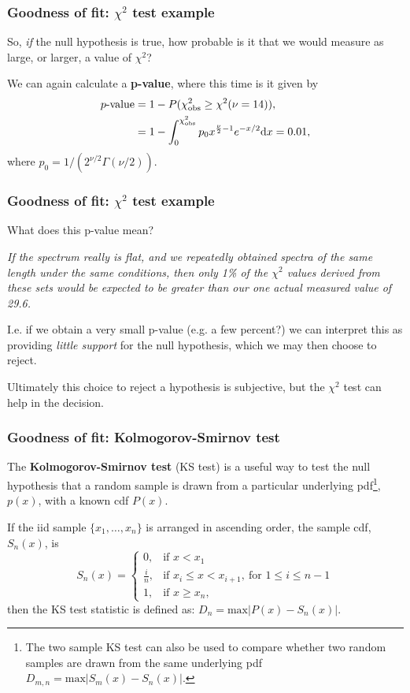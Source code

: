 \begin{frame}

\frametitle{Goodness of fit: $\chi^2$ test example}
\label{goodnessoffit:chi2testexample}

So, \emph{if} the null hypothesis is true, how probable is it that we would measure as large, or larger, a
value of $\chi^2$?

We can again calculate a \textbf{p-value}, where this time is it given by
\begin{align*}
p\text{-value} &= 1 - P(\chi^2_{\rm obs} \ge \chi^2(\nu=14)), \\
&= 1-\int_0^{\chi^2_{\rm obs}} p_0 x^{\frac{\nu}{2}-1}e^{-x/2} {\rm d}x = 0.01,
\end{align*}
where $p_0 = 1/(2^{\nu/2}\Gamma(\nu/2))$.

\end{frame}

\begin{frame}

\frametitle{Goodness of fit: $\chi^2$ test example}
\label{goodnessoffit:chi2testexample}

What does this p-value mean?

\emph{If the spectrum really is flat, and we repeatedly obtained spectra of the same length under the same
conditions, then only 1\% of the $\chi^2$ values derived from these sets would be expected to be greater
than our one actual measured value of 29.6.}

I.e. if we obtain a very small p-value (e.g. a few percent?) we can interpret this as providing \emph{little support}
for the null hypothesis, which we may then choose to reject.

Ultimately this choice to reject a hypothesis is subjective, but the $\chi^2$ test can help in the decision.

\end{frame}

\begin{frame}

\frametitle{Goodness of fit: Kolmogorov-Smirnov test}
\label{goodnessoffit:kolmogorov-smirnovtest}

The \textbf{Kolmogorov-Smirnov test} (KS test) is a useful way to test the null hypothesis that a random sample
is drawn from a particular underlying pdf\footnote{The two sample KS test can also be used to compare whether two random samples are drawn
from the same underlying pdf $D_{m,n} = \text{max}\left|S_m(x) - S_n(x)\right|$.}, $p(x)$, with a known cdf $P(x)$.

If the iid sample $\{x_1,\ldots,x_n\}$ is arranged in ascending order, the sample cdf, $S_n(x)$, is
\[
S_n(x) = 
\begin{cases}
0, & \text{if } x < x_1 \\
\frac{i}{n}, & \text{if } x_i \le x < x_{i+1},~\text{for }1 \le i \le n-1 \\
1, & \text{if } x \ge x_n,
\end{cases}
\]
then the KS test statistic is defined as: $D_n = \text{max}\left|P(x) - S_n(x)\right|$.

\end{frame}

